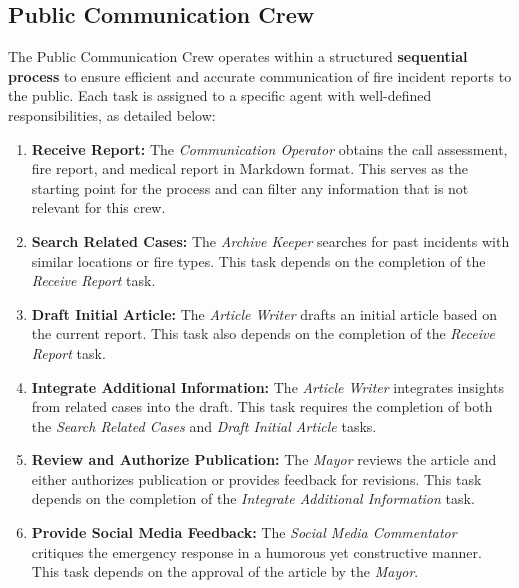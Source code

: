 \subsection{Public Communication Crew}

The Public Communication Crew operates within a structured \textbf{sequential process} to ensure efficient and accurate communication of fire incident reports to the public. Each task is assigned to a specific agent with well-defined responsibilities, as detailed below:

\begin{enumerate}
	\item \textbf{Receive Report:} The \textit{Communication Operator} obtains the call assessment, fire report, and medical report in Markdown format. This serves as the starting point for the process and can filter any information that is not relevant for this crew.
	\item \textbf{Search Related Cases:} The \textit{Archive Keeper} searches for past incidents with similar locations or fire types. This task depends on the completion of the \textit{Receive Report} task.
	\item \textbf{Draft Initial Article:} The \textit{Article Writer} drafts an initial article based on the current report. This task also depends on the completion of the \textit{Receive Report} task.
	\item \textbf{Integrate Additional Information:} The \textit{Article Writer} integrates insights from related cases into the draft. This task requires the completion of both the \textit{Search Related Cases} and \textit{Draft Initial Article} tasks.
	\item \textbf{Review and Authorize Publication:} The \textit{Mayor} reviews the article and either authorizes publication or provides feedback for revisions. This task depends on the completion of the \textit{Integrate Additional Information} task.
	\item \textbf{Provide Social Media Feedback:} The \textit{Social Media Commentator} critiques the emergency response in a humorous yet constructive manner. This task depends on the approval of the article by the \textit{Mayor}.
\end{enumerate}

